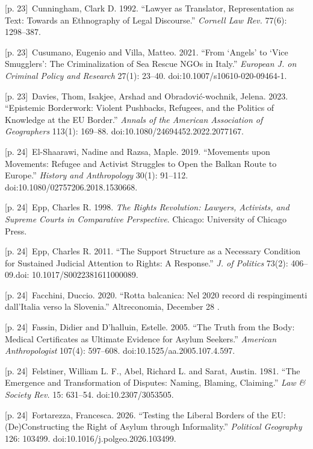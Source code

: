 \documentclass[10pt,a4paper]{article}
\begin{document}
{\scriptsize\color{gray} [p. 23]}\ Cunningham, Clark D. 1992. “Lawyer as Translator, Representation as Text: Towards an Ethnography of Legal Discourse.” \textit{Cornell Law Rev.} 77(6): 1298–387.\par
{\scriptsize\color{gray} [p. 23]}\ Cusumano, Eugenio and Villa, Matteo. 2021. “From ‘Angels’ to ‘Vice Smugglers’: The Criminalization of Sea Rescue NGOs in Italy.” \textit{European J. on Criminal Policy and Research} 27(1): 23–40. doi:10.1007/s10610-020-09464-1.\par
{\scriptsize\color{gray} [p. 23]}\ Davies, Thom, Isakjee, Arshad and Obradović-wochnik, Jelena. 2023. “Epistemic Borderwork: Violent Pushbacks, Refugees, and the Politics of Knowledge at the EU Border.” \textit{Annals of the American Association of Geographers} 113(1): 169–88. doi:10.1080/24694452.2022.2077167.\par
{\scriptsize\color{gray} [p. 24]}\ El-Shaarawi, Nadine and Razsa, Maple. 2019. “Movements upon Movements: Refugee and Activist Struggles to Open the Balkan Route to Europe.” \textit{History and Anthropology} 30(1): 91–112. doi:10.1080/02757206.2018.1530668.\par
{\scriptsize\color{gray} [p. 24]}\ Epp, Charles R. 1998. \textit{The Rights Revolution: Lawyers, Activists, and Supreme Courts in Comparative Perspective}. Chicago: University of Chicago Press.\par
{\scriptsize\color{gray} [p. 24]}\ Epp, Charles R. 2011. “The Support Structure as a Necessary Condition for Sustained Judicial Attention to Rights: A Response.” \textit{J. of Politics} 73(2): 406–09.doi: 10.1017/S0022381611000089.\par
{\scriptsize\color{gray} [p. 24]}\ Facchini, Duccio. 2020. “Rotta balcanica: Nel 2020 record di respingimenti dall’Italia verso la Slovenia.” Altreconomia, December 28 .\par
{\scriptsize\color{gray} [p. 24]}\ Fassin, Didier and D’halluin, Estelle. 2005. “The Truth from the Body: Medical Certificates as Ultimate Evidence for Asylum Seekers.” \textit{American Anthropologist} 107(4): 597–608. doi:10.1525/aa.2005.107.4.597.\par
{\scriptsize\color{gray} [p. 24]}\ Felstiner, William L. F., Abel, Richard L. and Sarat, Austin. 1981. “The Emergence and Transformation of Disputes: Naming, Blaming, Claiming.” \textit{Law \& Society Rev.} 15: 631–54. doi:10.2307/3053505.\par
{\scriptsize\color{gray} [p. 24]}\ Fortarezza, Francesca. 2026. “Testing the Liberal Borders of the EU: (De)Constructing the Right of Asylum through Informality.” \textit{Political Geography} 126: 103499. doi:10.1016/j.polgeo.2026.103499.\par
\end{document}
